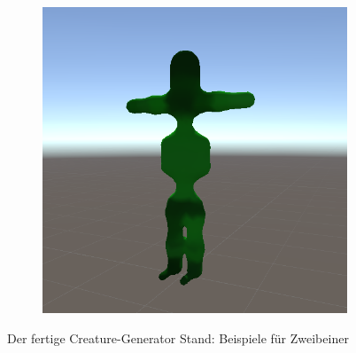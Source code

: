 \begin{figure}[ht]
\begin{subfigure}[b]{0.2\textwidth}
    \end{subfigure}
    \begin{subfigure}[b]{0.2\textwidth}
        \centering
        \includegraphics[width=\textwidth, height=\textwidth]{resources/img/Finished_Creatures_2/creature_12}
    \end{subfigure}
    \caption{Der fertige Creature-Generator Stand: Beispiele für Zweibeiner}
    \label{fig:finished_CG_2}
\end{figure}

